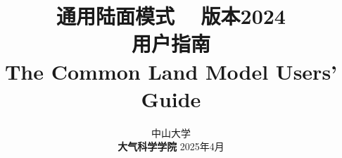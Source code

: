 \documentclass[a4paper,12pt,twoside]{article}
\begin{document}
\title{\huge {\bf 通用陆面模式 ~ 版本2024 \\ 用户指南}\\
\vspace{6mm}
\fontsize {22}{24}
\bf{ The Common Land Model Users' Guide}
\fontsize {20}{23}
 \vskip 2in
}

\author{
 \large{ 中山大学 }\\
 {\bf 大气科学学院}
 \vskip 2in
 \upshape
 \large
 \vskip 0.5in
 2025年4月
}

\normallinespacing
\maketitle

\preface

\clearpage 
\pagestyle{fancy}

\tableofcontents
\clearpage














\end{document}
